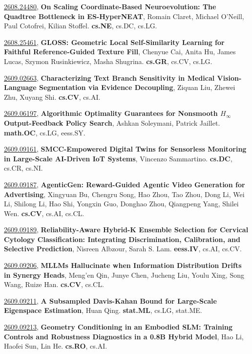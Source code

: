 \documentclass[9pt, a4paper]{article}
\theoremstyle{plain}
\theoremstyle{definition}
\theoremstyle{remark}
\newcommand{\arxivwithtarget}[3]{\hypertarget{#1}{}\href{https://arxiv.org/abs/#1}{#1}, \textbf{\textcolor{arxivblue}{#2}}, #3. }
\begin{document}
\arxivwithtarget{2608.24480}{On Scaling Coordinate-Based Neuroevolution: The Quadtree Bottleneck in ES-HyperNEAT}{Romain Claret, Michael O'Neill, Paul Cotofrei, Kilian Stoffel}\textbf{cs.NE}, cs.DC, cs.LG.



\arxivwithtarget{2608.25461}{GLOSS: Geometric Local Self-Similarity Learning for Faithful Reference-Guided Texture Fill}{Chenyue Cai, Anita Hu, James Lucas, Szymon Rusinkiewicz, Masha Shugrina}\textbf{cs.GR}, cs.CV, cs.LG.



\arxivwithtarget{2609.02663}{Characterizing Text Branch Sensitivity in Medical Vision-Language Segmentation via Evidence Decoupling}{Ziquan Liu, Zhewei Zhu, Xuyang Shi}\textbf{cs.CV}, cs.AI.



\arxivwithtarget{2609.06197}{Algorithmic Optimality Guarantees for Nonsmooth $H_\infty$ Output-Feedback Policy Search}{Ashkan Soleymani, Patrick Jaillet}\textbf{math.OC}, cs.LG, eess.SY.



\arxivwithtarget{2609.09161}{SMCC-Empowered Digital Twins for Sensorless Monitoring in Large-Scale AI-Driven IoT Systems}{Vincenzo Sammartino}\textbf{cs.DC}, cs.CR, cs.NI.



\arxivwithtarget{2609.09187}{AgenticGen: Reward-Guided Agentic Video Generation for Advertising}{Xingyuan Bu, Chengru Song, Hao Zhou, Tao Zhou, Dong Li, Wei Li, Shilong Li, Hao Shi, Yongxin Guo, Donghao Zhou, Qiangpeng Yang, Shilei Wen}\textbf{cs.CV}, cs.AI, cs.CL.



\arxivwithtarget{2609.09189}{Reliability-Aware Hybrid-K Ensemble Selection for Cervical Cytology Classification: Integrating Discrimination, Calibration, and Selective Prediction}{Nisreen Albzour, Sarah S. Lam}\textbf{eess.IV}, cs.AI, cs.CV.



\arxivwithtarget{2609.09206}{MLLMs Hallucinate when Information Distribution Drifts in Synergy Heads}{Meng'en Qin, Junye Chen, Jucheng Liu, Youlu Xing, Song Wang, Ruize Han}\textbf{cs.CV}, cs.CL.



\arxivwithtarget{2609.09211}{A Subsampled Davis-Kahan Bound for Large-Scale Eigenspace Estimation}{Huan Qing}\textbf{stat.ML}, cs.LG, stat.ME.



\arxivwithtarget{2609.09213}{Geometry Conditioning in an Embodied SLM: Training Controls and Robustness Diagnostics in a 0.8B Hybrid Model}{Hao Li, Haofei Sun, Lin He}\textbf{cs.RO}, cs.AI.
\end{document}
